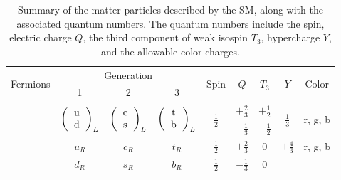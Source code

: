\begin{table}
  \caption[
    Summary of the matter particles described by the SM, along with the
    associated quantum numbers.
  ]{
    Summary of the matter particles described by the SM, along with the
    associated quantum numbers.
    The quantum numbers include the spin, electric charge $Q$, the third
    component of weak isospin $T_3$, hypercharge $Y$, and the allowable color
    charges.
  }
  \label{tab:sm_matter_content}
  \begin{center}
    \begin{tabular}{ccccccccc}
      \toprule
      \multirow{2}{*}{Fermions} &
      \multicolumn{3}{c}{Generation} &
      \multirow{2}{*}{Spin} &
      \multirow{2}{*}{$Q$} &
      \multirow{2}{*}{$T_3$} &
      \multirow{2}{*}{$Y$} &
      \multirow{2}{*}{Color}
      \\[1ex]
      & 1 & 2 & 3
      \\
      \midrule
      \addlinespace[1ex]
      \multirow{5}{*}{Quarks} &
      \multirow{2}{*}{$\left(
        \begin{tabular}{c} u \\ d \end{tabular} \right)_{L}$ } & %
      \multirow{2}{*}{$\left(
        \begin{tabular}{c} c \\ s \end{tabular} \right)_{L}$ } & %
      \multirow{2}{*}{$\left(
        \begin{tabular}{c} t \\ b \end{tabular} \right)_{L}$ } & %
      \multirow{2}{*}{$\frac{1}{2}$} & %
      $+\frac{2}{3}$ & %
      $+\frac{1}{2}$ & %
      \multirow{2}{*}{$\frac{1}{3}$} & %
      \multirow{2}{*}{r, g, b} %
      \\[1ex]
      & %
      & %
      & %
      & %
      & %
      $-\frac{1}{3}$ & %
      $-\frac{1}{2}$ & %
      & %
      \\
      \cmidrule{2-9}
      &
      $u_R$ &
      $c_R$ &
      $t_R$ &
      $\frac{1}{2}$ & %
      $+\frac{2}{3}$ & %
      0 & %
      $+\frac{4}{3}$ & %
      r, g, b %
      \\[1ex]
      &
      $d_R$ &
      $s_R$ &
      $b_R$ &
      $\frac{1}{2}$ & %
      $-\frac{1}{3}$ & %
      0 & %

\end{tabular}
\end{center}
\end{table}
